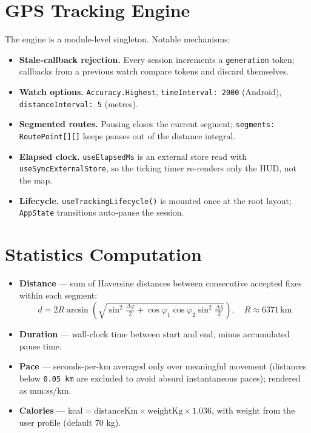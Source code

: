\documentclass[11pt,a4paper]{report}
\begin{document}
\section{GPS Tracking Engine}
The engine is a module-level singleton. Notable mechanisms:
\begin{itemize}[nosep]
    \item \textbf{Stale-callback rejection.} Every session increments a \texttt{generation} token; callbacks from a previous watch compare tokens and discard themselves.
    \item \textbf{Watch options.} \texttt{Accuracy.Highest}, \texttt{timeInterval: 2000} (Android), \texttt{distanceInterval: 5} (metres).
    \item \textbf{Segmented routes.} Pausing closes the current segment; \texttt{segments: RoutePoint[][]} keeps pauses out of the distance integral.
    \item \textbf{Elapsed clock.} \texttt{useElapsedMs} is an external store read with \texttt{useSyncExternalStore}, so the ticking timer re-renders only the HUD, not the map.
    \item \textbf{Lifecycle.} \texttt{useTrackingLifecycle()} is mounted once at the root layout; \texttt{AppState} transitions auto-pause the session.
\end{itemize}

\section{Statistics Computation}
\begin{itemize}[nosep]
    \item \textbf{Distance} --- sum of Haversine distances between consecutive accepted fixes within each segment:
    \begin{equation}
    d = 2R \arcsin\!\left(\sqrt{\sin^2\!\tfrac{\Delta\varphi}{2} + \cos\varphi_1 \cos\varphi_2 \sin^2\!\tfrac{\Delta\lambda}{2}}\right), \quad R \approx 6371\,\text{km}
    \end{equation}
    \item \textbf{Duration} --- wall-clock time between start and end, minus accumulated pause time.
    \item \textbf{Pace} --- seconds-per-km averaged only over meaningful movement (distances below \texttt{0.05 km} are excluded to avoid absurd instantaneous paces); rendered as mm:ss/km.
    \item \textbf{Calories} --- $\text{kcal} = \text{distanceKm} \times \text{weightKg} \times 1.036$, with weight from the user profile (default 70 kg).
\end{itemize}
\end{document}
